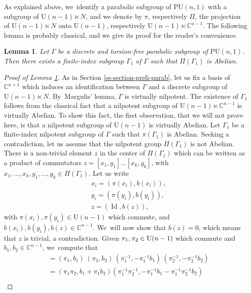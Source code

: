 \documentclass[11pt]{article}
\newtheorem{lemma}[theorem]{Lemma}
\theoremstyle{definition}
\newcommand{\C}{\mathbb{C}}
\newcommand{\PU}{\mathrm{PU}}
\DeclareMathOperator{\Id}{Id}
\def\C{\mathbb{C}}
\newcommand{\PU}{\mathrm{PU}}
\begin{document}
As explained above, we~identify a parabolic subgroup of $\PU(n,1)$ with a subgroup of $\mathrm{U}(n-1)\ltimes N$, and we denote by $\pi$, respectively $\Pi $, the projection of $\mathrm{U}(n-1)\ltimes N$ onto $\mathrm{U}(n-1)$, respectively $ \mathrm{U}(n-1)\ltimes \C^{n-1}$. The following lemma is probably classical, and we give its proof for the reader's convenience.

\begin{lemma}\label{lem-ssgrp-pi-abelien}
Let $\Gamma$ be a discrete and torsion-free parabolic subgroup of $\PU(n,1)$. Then there exists a finite-index subgroup $\Gamma_1$ of $\Gamma$ such that $\Pi(\Gamma_1)$ is Abelian.
\end{lemma}

\begin{proof}[Proof of Lemma \ref{lem-ssgrp-pi-abelien}]
As in Section \ref{ss-section-preli-parab}, let us fix a basis of $\C^{n+1}$ which induces an identification between $\Gamma$ and a discrete subgroup of $\mathrm{U}(n-1)\ltimes N$. By~Margulis' lemma, $\Gamma$ is virtually nilpotent. The existence of $\Gamma_1$ follows from the classical fact that a nilpotent subgroup of $\mathrm{U}(n-1)\ltimes \C^{n-1}$ is virtually Abelian. To show this fact, the first observation, that we will not prove here, is that a nilpotent subgroup of $\mathrm{U}(n-1)$ is virtually Abelian. Let $\Gamma_1$ be a finite-index nilpotent subgroup of $\Gamma$ such that $\pi(\Gamma_1)$ is Abelian. Seeking a contradiction, let us assume that the nilpotent group $\Pi(\Gamma_1)$ is not Abelian. There is a non-trivial element $z$ in the center of $\Pi(\Gamma_1)$ which can be written as a product of commutators $z=[x_1,y_1]\dots[x_k,y_k]$, with $x_1,\dots,x_k,y_1,\dots,y_k\in \Pi(\Gamma_1)$. Let us write
\begin{align*}
&x_i=(\pi(x_i),b(x_i)),\\
&y_i=(\pi(y_i),b(y_i)),\\
&z= (\Id,b(z)),
\end{align*}
with $\pi(x_i),\pi(y_i)\in \mathrm{U}(n-1)$ which commute, and $b(x_i),b(y_i),b(z)\in \C^{n-1}$. We~will now show that $b(z)=0$, which means that $z$ is trivial, a contradiction.
Given $\pi_1,\pi_2\in\nobreak \mathrm{U}(n-\nobreak1)$ which commute and $b_1,b_2\in \C^{n-1}$, we~compute that
\begin{align*}
[(\pi_1,b_1),(\pi_2,b_2)]&=(\pi_1,b_1)\ (\pi_2,b_2)\ (\pi_1^{-1},-\pi_1^{-1}b_1)\ (\pi_2^{-1},-\pi_2^{-1}b_2) \\
&= (\pi_1\pi_2,b_1+\pi_1b_2)(\pi_1^{-1}\pi_2^{-1},-\pi_1^{-1}b_1 - \pi_1^{-1}\pi_2^{-1}b_2)\\

\end{align*}
\end{proof}
\end{document}
